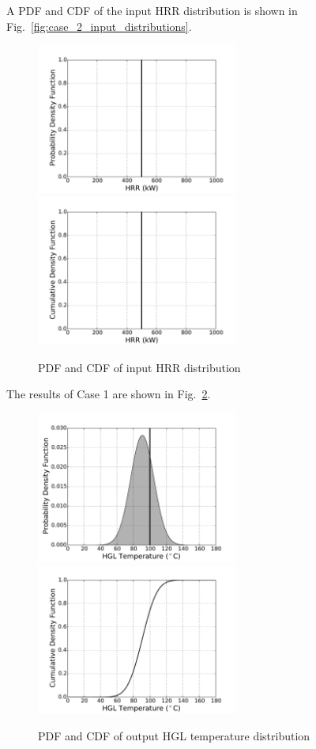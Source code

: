 \documentclass[12pt]{article}
\begin{document}
\clearpage


A PDF and CDF of the input HRR distribution is shown in Fig.~\ref{fig:case_2_input_distributions}.

\begin{figure}[!ht]
\includegraphics[width=2.6in]{Figures/input_PDF_point}
\includegraphics[width=2.6in]{Figures/input_CDF_point}
\caption{PDF and CDF of input HRR distribution}
\label{fig:case_1_input_distributions}
\end{figure}

The results of Case 1 are shown in Fig.~\ref{fig:case_1_output_distributions}.

\begin{figure}[!ht]
\includegraphics[width=2.6in]{Figures/output_PDF_1_model}
\includegraphics[width=2.6in]{Figures/output_CDF_1_model}
\caption{PDF and CDF of output HGL temperature distribution}
\label{fig:case_1_output_distributions}
\end{figure}
\end{document}
